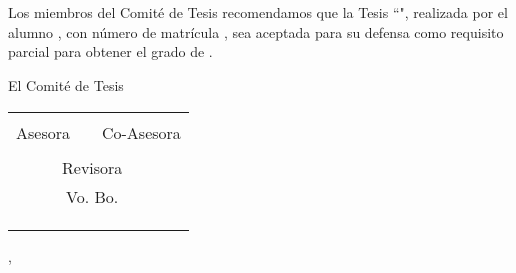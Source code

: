 \begin{center}
{\bf \large \uanl} \\
{\bf \fime} \\
{\bf \depg}
\end{center}
\vskip 4mm
\vspace*{-6mm}

Los miembros del Comité de Tesis recomendamos que la Tesis ``\titulo", realizada por el alumno \autor, con número de matrícula \matricula, sea aceptada para su defensa como requisito parcial para obtener el grado de \grado\orientacion.
\vskip 10mm
\ifdoctorado{\vskip 10mm}\else{\vskip 8mm}\fi

\begin{center}
\vspace*{-10mm}
El Comité de Tesis\\
\vskip 20mm
\begin{tabular}{p{20mm}p{20mm}p{2mm}p{20mm}p{20mm}}
	\cline{1-2} \cline{4-5}
	\multicolumn{2}{c}{\asesor} & & \multicolumn{2}{c}{\revisorA} \\
	\multicolumn{2}{c}{Asesora} & & \multicolumn{2}{c}{Co-Asesora} \\[17mm]
	\cline{2-4}
	& \multicolumn{3}{c}{\revisorB} & \\
	& \multicolumn{3}{c}{Revisora}  & \\[15mm]
	& \multicolumn{3}{c}{Vo. Bo.} & \\[15mm]
	\cline{2-4}
	& \multicolumn{3}{c}{\vobo}   & \\
	& \multicolumn{3}{c}{\depgr}   & \\ &&&&
\end{tabular}
\vfill
\snnl, \MakeLowercase{\fecha}

\end{center}

